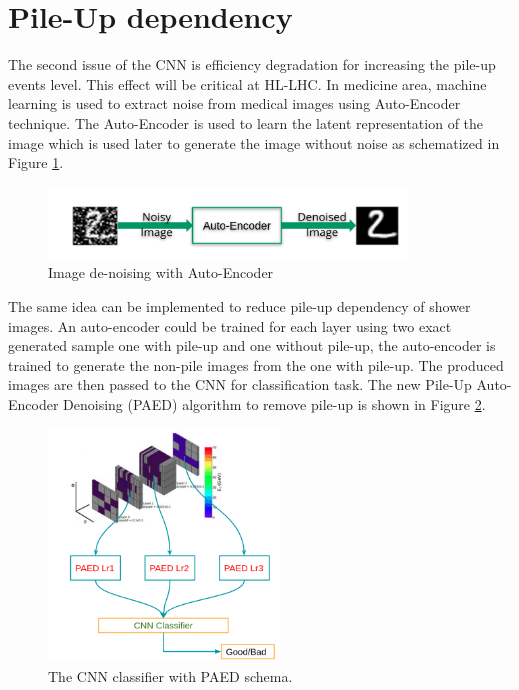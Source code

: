 \section{Pile-Up dependency}
The second issue of the CNN is efficiency degradation for increasing the pile-up events level. This effect will be critical at HL-LHC. In medicine area, machine learning is used to extract noise from medical images using Auto-Encoder technique. The Auto-Encoder is used to learn the latent representation of the image which is used later to generate the image without noise as schematized in Figure \ref{fig:Adx3:AutoEncoder}.

\begin{figure}[H]
    \centering
    \includegraphics[width=0.85\textwidth]{Adx/Adx3/Img/AutoEncoder.png}
    \caption{Image de-noising with Auto-Encoder}
    \label{fig:Adx3:AutoEncoder}
\end{figure}

The same idea can be implemented to reduce pile-up dependency of shower images. An auto-encoder could be trained for each layer using two exact generated sample one with pile-up and one without pile-up, the auto-encoder is trained to generate the non-pile images from the one with pile-up. The produced images are then passed to the CNN for classification task. The new Pile-Up Auto-Encoder Denoising (PAED) algorithm to remove pile-up is shown in Figure \ref{fig:Adx3:PAED}.

\begin{figure}[htbp]
    \centering
    \includegraphics[width=0.55\textwidth]{Adx/Adx3/Img/PAED.png}
    \begin{tcolorbox}[colback=black!5!white,colframe=white!75!black]
    \caption{The CNN classifier with PAED schema.}
    \label{fig:Adx3:PAED}
    \end{tcolorbox}
    
\end{figure}